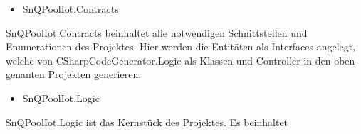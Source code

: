 \begin{itemize}
    \item SnQPoolIot.Contracts
\end{itemize}

SnQPoolIot.Contracts beinhaltet alle notwendigen Schnittstellen und Enumerationen des Projektes.
Hier werden die Entitäten als Interfaces angelegt, 
welche von CSharpCodeGenerator.Logic als Klassen und Controller in den oben genanten Projekten generieren.

\begin{itemize}
    \item SnQPoolIot.Logic
\end{itemize}

SnQPoolIot.Logic ist das Kernstück des Projektes. Es beinhaltet 
